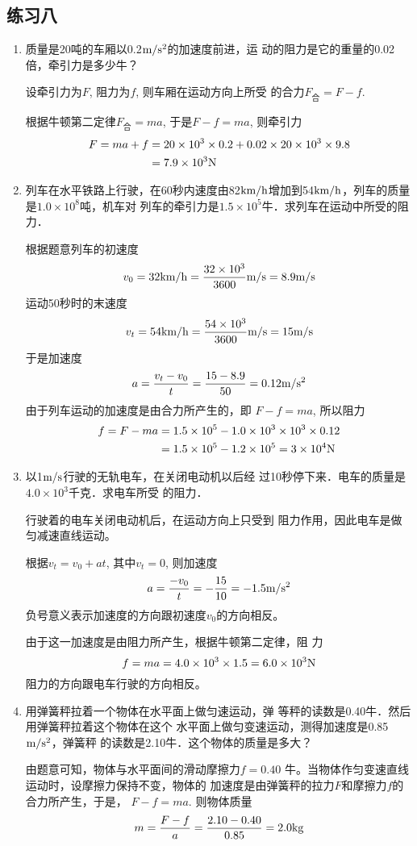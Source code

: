 \subsection{练习八}
\begin{enumerate}
\item 质量是20吨的车厢以0.2$\text{m}/\text{s}^2$的加速度前进，运
动的阻力是它的重量的0.02倍，牵引力是多少牛？
	 
\begin{solution}
    设牵引力为$F$, 阻力为$f$, 则车厢在运动方向上所受
    的合力$F_{\text{合}}=F-f$.

    根据牛顿第二定律$F_{\text{合}}=ma$, 于是$F-f=ma$, 则牵引力
\[\begin{split}
    F=ma+f &=20\times10^3\times0.2+0.02\times20\times10^3\times9.8\\
    &=7.9\times10^3{\rm N}
\end{split}\]
\end{solution}
\item  列车在水平铁路上行驶，在60秒内速度由82$\text{km}/\text{h}$增加到54$\text{km}/\text{h}$，列车的质量是$1.0\times 10^8$吨，机车对
列车的牵引力是$1.5\times 10^5$牛．求列车在运动中所受的阻力．
	 
\begin{solution}
    根据题意列车的初速度
    $$v_0=32\text{km}/\text{h}=\dfrac{32\times 10^3}{3600}\text{m}/\text{s}=8.9\text{m}/\text{s}$$
    运动50秒时的末速度 
\[v_t=54\text{km}/\text{h}=\frac{54\times 10^3}{3600}\text{m}/\text{s}=15\text{m}/\text{s}\]
于是加速度
\[a=\frac{v_t-v_0}{t}=\frac{15-8.9}{50}=0.12\text{m}/\text{s}^2\]
由于列车运动的加速度是由合力所产生的，即
$F-f=ma$, 所以阻力
\[\begin{split}
    f=F-ma&=1.5\times10^5-1.0\times10^3\times10^3\times0.12\\
&=    1.5\times 10^5-1.2\times10^5=3\times10^4{\rm N}
\end{split}\]
\end{solution}
\item  以1$\text{m}/\text{s}$行驶的无轨电车，在关闭电动机以后经
过10秒停下来．电车的质量是$4.0\times 10^3$千克．求电车所受
的阻力．
	 
\begin{solution}
    行驶着的电车关闭电动机后，在运动方向上只受到
阻力作用，因此电车是做匀减速直线运动。

根据$v_t=v_0+at$, 其中$v_t=0$, 则加速度
\[a=\frac{-v_0}{t}=-\frac{15}{10}=-1.5\text{m}/\text{s}^2\]
负号意义表示加速度的方向跟初速度$v_0$的方向相反。

由于这一加速度是由阻力所产生，根据牛顿第二定律，阻
力
\[f=ma=4.0\times10^3\times1.5=6.0\times10^3{\rm N}\]
阻力的方向跟电车行驶的方向相反。
\end{solution}
\item  用弹簧秤拉着一个物体在水平面上做匀速运动，弹
等秤的读数是0.40牛．然后用弹簧秤拉着这个物体在这个
水平面上做匀变速运动，测得加速度是0.85$\text{m}/\text{s}^2$，弹簧秤
的读数是2.10牛．这个物体的质量是多大？
	 
\begin{solution}
    由题意可知，物体与水平面间的滑动摩擦力$f=0.40$
牛。当物体作匀变速直线运动时，设摩擦力保持不变，物体的
加速度是由弹簧秤的拉力$F$和摩擦力$f$的合力所产生，于是，
$F-f=ma$. 则物体质量
\[m=\frac{F-f}{a}=\frac{2.10-0.40}{0.85}=2.0{\rm kg}\]
\end{solution}
\end{enumerate}



